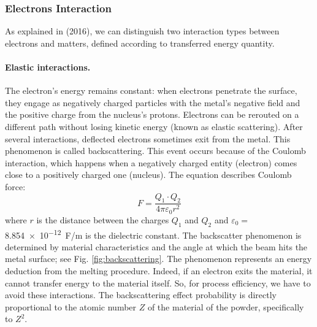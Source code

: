 \subsubsection{Electrons Interaction}
\label{sssec:electroninteractions}
As explained in \citeauthor{korner_additive_2016} (2016), we can distinguish two interaction types between electrons and matters, defined according to transferred energy quantity. 
\paragraph{Elastic interactions.} The electron's energy remains constant: when electrons penetrate the surface, they engage as negatively charged particles with the metal's negative field and the positive charge from the nucleus's protons. Electrons can be rerouted on a different path without losing kinetic energy (known as elastic scattering). After several interactions, deflected electrons sometimes exit from the metal. This phenomenon is called backscattering. This event occurs because of the Coulomb interaction, which happens when a negatively charged entity (electron) comes close to a positively charged one (nucleus). The equation describes Coulomb force:
\begin{equation}
    \label{eq:coulomb}
    F=\frac{Q_1\cdot Q_2}{4\pi \varepsilon_0 r^2}
\end{equation}
where $r$ is the distance between the charges $Q_1$ and $Q_2$ and $\varepsilon_0=$ \SI{8.854e-12}{\farad / \metre} is the dielectric constant. The backscatter phenomenon is determined by material characteristics and the angle at which the beam hits the metal surface; see Fig. \ref{fig:backscattering}. The phenomenon represents an energy deduction from the melting procedure. Indeed, if an electron exits the material, it cannot transfer energy to the material itself. So, for process efficiency, we have to avoid these interactions. The backscattering effect probability is directly proportional to the atomic number $Z$ of the material of the powder, specifically to $Z^2$.
